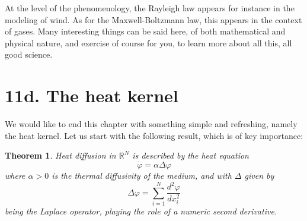 \documentclass[12pt]{amsbook}
\newtheorem{theorem}{Theorem}[chapter]
\begin{document}
At the level of the phenomenology, the Rayleigh law appears for instance in the modeling of wind. As for the Maxwell-Boltzmann law, this appears in the context of gases. Many interesting things can be said here, of both mathematical and physical nature, and exercise of course for you, to learn more about all this, all good science.

\section*{11d. The heat kernel}

We would like to end this chapter with something simple and refreshing, namely the heat kernel. Let us start with the following result, which is of key importance:


\begin{theorem}
Heat diffusion in $\mathbb R^N$ is described by the heat equation
$$\dot{\varphi}=\alpha\Delta\varphi$$
where $\alpha>0$ is the thermal diffusivity of the medium, and with $\Delta$ given by
$$\Delta\varphi=\sum_{i=1}^N\frac{d^2\varphi}{dx_i^2}$$
being the Laplace operator, playing the role of a numeric second derivative.
\end{theorem}
\end{document}
